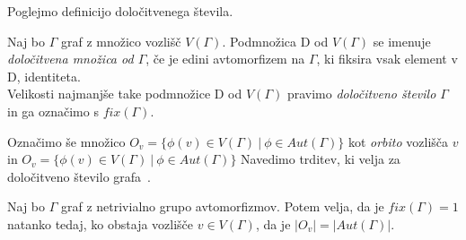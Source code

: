 \documentclass[mat1, tisk]{fmfdelo}
\begin{document}
%
Poglejmo definicijo določitvenega števila.
%
\begin{definicija}
  Naj bo $\Gamma$ graf z množico vozlišč $V(\Gamma)$. Podmnožica D od $V(\Gamma)$ 
  se imenuje \emph{določitvena množica od $\Gamma$}, če je edini avtomorfizem na 
  $\Gamma$, ki fiksira vsak element v D, identiteta.\\
  Velikosti najmanjše take podmnožice D od $V(\Gamma)$ pravimo 
  \emph{določitveno število $\Gamma$} in ga označimo s $fix(\Gamma)$.
\end{definicija}
%
Označimo še množico 
$O_v = \{ \phi(v) \in V(\Gamma)~|~ \phi \in Aut(\Gamma) \}$ kot 
\emph{orbito} vozlišča $v$ in $O_v = \{ \phi(v) \in V(\Gamma)~|~ \phi \in Aut(\Gamma) \}$
Navedimo trditev, ki velja za določitveno število grafa~\cite{1erwin}.
%
\begin{trditev}
  Naj bo $\Gamma$ graf z netrivialno grupo avtomorfizmov. Potem velja, da 
  je $fix(\Gamma)=1$ natanko tedaj, ko obstaja vozlišče $v \in V(\Gamma)$, 
  da je $|O_v| = |Aut(\Gamma)|$.
\end{trditev}
\end{document}
